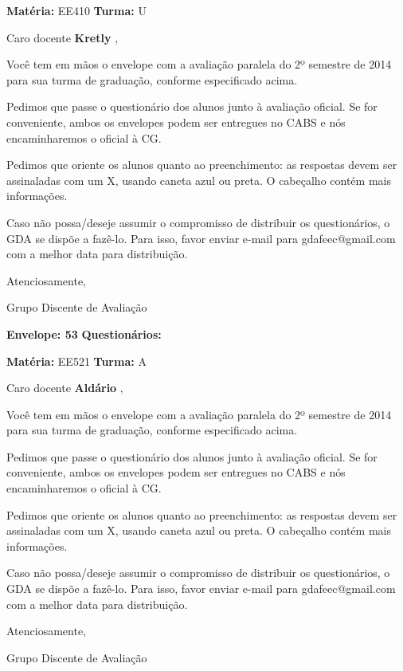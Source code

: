 \documentclass[a5paper]{letter}
\begin{document}
\newpage
\thispagestyle{empty}

\hfill {\bf Matéria:} EE410 {\bf Turma:} U

Caro docente {\bf Kretly }, 

	Você tem em mãos o envelope com a avaliação paralela do 2º semestre de 2014 para sua turma de graduação, conforme especificado acima.

	Pedimos que passe o questionário dos alunos junto à avaliação oficial. Se for conveniente, ambos os envelopes podem ser entregues no CABS e nós encaminharemos o oficial à CG.

Pedimos que oriente os alunos quanto ao preenchimento: as respostas devem ser assinaladas com um X, usando caneta azul ou preta. O cabeçalho contém mais informações.

	Caso não possa/deseje assumir o compromisso de distribuir os questionários, o GDA se dispõe a fazê-lo. Para isso, favor enviar e-mail para gdafeec@gmail.com com a melhor data para distribuição.


Atenciosamente, 

Grupo Discente de Avaliação

\vspace{0.5cm}

{\bf Envelope: 53 }		\hfill	{\bf Questionários:} \hspace{2cm}

\newpage
\thispagestyle{empty}

\hfill {\bf Matéria:} EE521 {\bf Turma:} A

Caro docente {\bf Aldário }, 

	Você tem em mãos o envelope com a avaliação paralela do 2º semestre de 2014 para sua turma de graduação, conforme especificado acima.

	Pedimos que passe o questionário dos alunos junto à avaliação oficial. Se for conveniente, ambos os envelopes podem ser entregues no CABS e nós encaminharemos o oficial à CG.

Pedimos que oriente os alunos quanto ao preenchimento: as respostas devem ser assinaladas com um X, usando caneta azul ou preta. O cabeçalho contém mais informações.

	Caso não possa/deseje assumir o compromisso de distribuir os questionários, o GDA se dispõe a fazê-lo. Para isso, favor enviar e-mail para gdafeec@gmail.com com a melhor data para distribuição.


Atenciosamente, 

Grupo Discente de Avaliação
\end{document}
